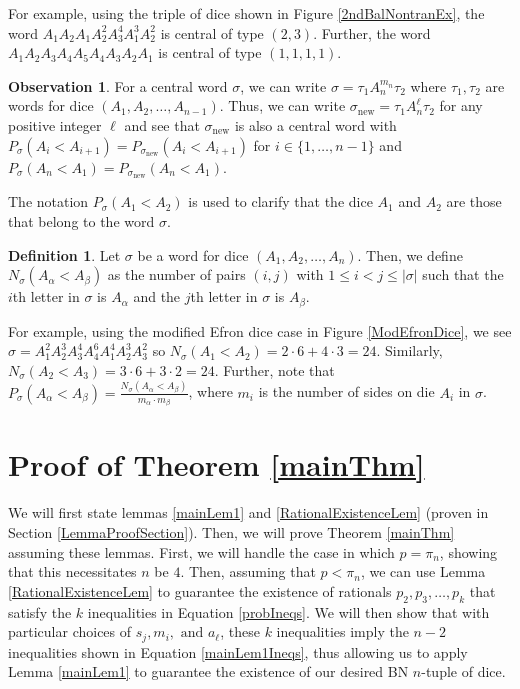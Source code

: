 \documentclass[11pt]{article}
\theoremstyle{definition}
\newtheorem{defn}[theorem]{Definition}
\newtheorem{observation}[theorem]{Observation}
\begin{document}
For example, using the triple of dice shown in Figure \ref{2ndBalNontranEx}, the word $A_1A_2A_1A_2^2A_3^4A_1^3A_2^2$ is central of type $(2,3)$. Further, the word $A_1A_2A_3A_4A_5A_4A_3A_2A_1$ is central of type $(1,1,1,1)$.

\begin{observation} \label{SplitCentralWords}
    For a central word $\sigma$, we can write $\sigma = \tau_1 A_{n}^{m_n} \tau_2$ where $\tau_1,\tau_2$ are words for dice $(A_1,A_2,\dots,A_{n-1})$. Thus, we can write $\sigma_\text{new} = \tau_1A_n^\ell \tau_2$ for any positive integer $\ell$ and see that $\sigma_\text{new}$ is also a central word with $P_\sigma(A_i<A_{i+1}) = P_{\sigma_\text{new}}(A_i<A_{i+1})$ for $i \in \{ 1,\dots,n-1 \}$ and $P_\sigma(A_n < A_1) = P_{\sigma_\text{new}}(A_n<A_1)$.
\end{observation}
The notation $P_\sigma(A_1<A_2)$ is used to clarify that the dice $A_1$ and $A_2$ are those that belong to the word $\sigma$.

\begin{defn}
    Let $\sigma$ be a word for dice $(A_1,A_2,\dots,A_n)$. Then, we define $N_\sigma(A_\alpha < A_\beta)$ as the number of pairs $(i,j)$ with $1 \leq i < j \leq |\sigma|$ such that the $i$th letter in $\sigma$ is $A_\alpha$ and the $j$th letter in $\sigma$ is $A_\beta$.
\end{defn}

For example, using the modified Efron dice case in Figure \ref{ModEfronDice}, we see $\sigma = A_1^2A_2^3A_3^4A_4^6A_1^4A_2^3A_3^2$ so $N_\sigma(A_1<A_2) = 2\cdot 6 + 4\cdot 3 = 24$. Similarly, $N_\sigma(A_2<A_3) = 3\cdot 6 + 3 \cdot 2 = 24$. Further, note that $P_\sigma(A_\alpha < A_\beta) = \frac{N_\sigma(A_\alpha < A_\beta)}{m_\alpha \cdot m_\beta}$, where $m_i$ is the number of sides on die $A_i$ in $\sigma$.

\section{Proof of Theorem \ref{mainThm}}\label{MainProof}

We will first state lemmas \ref{mainLem1} and \ref{RationalExistenceLem} (proven in Section \ref{LemmaProofSection}). Then, we will prove Theorem \ref{mainThm} assuming these lemmas. First, we will handle the case in which $p = \pi_n$, showing that this necessitates $n$ be $4$. Then, assuming that $p < \pi_n$, we can use Lemma \ref{RationalExistenceLem} to guarantee the existence of rationals $p_2,p_3,\dots,p_k$ that satisfy the $k$ inequalities in Equation \ref{probIneqs}. We will then show that with particular choices of $s_j,m_i, \text{ and } a_\ell$, these $k$ inequalities imply the $n-2$ inequalities shown in Equation \ref{mainLem1Ineqs}, thus allowing us to apply Lemma \ref{mainLem1} to guarantee the existence of our desired BN $n$-tuple of dice.
\end{document}
